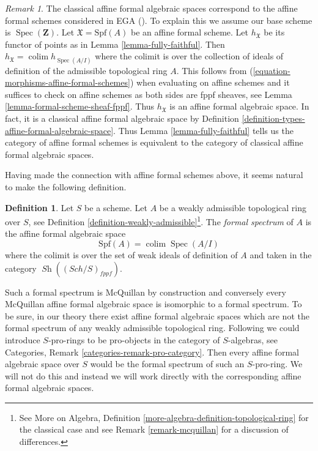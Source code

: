 \documentclass{stacks-project}
\theoremstyle{plain}
\theoremstyle{definition}
\newtheorem{definition}[subsection]{Definition}
\theoremstyle{remark}
\newtheorem{remark}[subsection]{Remark}
\numberwithin{equation}{subsection}
\def\colim{\mathop{\mathrm{colim}}\nolimits}
\def\Spec{\mathop{\mathrm{Spec}}}
\def\Sch{\mathit{Sch}}
\def\Sh{\mathop{\mathit{Sh}}\nolimits}
\begin{document}
\begin{remark}
\label{remark-compare-with-affine-formal-schemes}
The classical affine formal algebraic spaces correspond to the
affine formal schemes considered in EGA (\cite{EGA}). To explain this
we assume our base scheme is $\Spec(\mathbf{Z})$. Let
$\mathfrak X = \text{Spf}(A)$ be an affine formal scheme.
Let $h_\mathfrak X$ be its functor of points as in
Lemma \ref{lemma-fully-faithful}.
Then $h_\mathfrak X = \colim h_{\Spec(A/I)}$ where the colimit
is over the collection of ideals of definition of the admissible
topological ring $A$. This follows from
(\ref{equation-morphisms-affine-formal-schemes})
when evaluating on affine schemes and it suffices to check
on affine schemes as both sides are fppf sheaves, see
Lemma \ref{lemma-formal-scheme-sheaf-fppf}.
Thus $h_\mathfrak X$ is an affine formal algebraic space.
In fact, it is a classical affine formal algebraic space
by Definition \ref{definition-types-affine-formal-algebraic-space}.
Thus Lemma \ref{lemma-fully-faithful} tells us
the category of affine formal schemes is equivalent to the category
of classical affine formal algebraic spaces.
\end{remark}

\noindent
Having made the connection with affine formal schemes above,
it seems natural to make the following definition.

\begin{definition}
\label{definition-affine-formal-spectrum}
Let $S$ be a scheme. Let $A$ be a weakly admissible topological ring over
$S$, see Definition \ref{definition-weakly-admissible}\footnote{See
More on Algebra, Definition
\ref{more-algebra-definition-topological-ring}
for the classical case and see Remark \ref{remark-mcquillan}
for a discussion of differences.}.
The {\it formal spectrum} of $A$ is the affine formal algebraic space
$$
\text{Spf}(A) = \colim \Spec(A/I)
$$
where the colimit is over the set of weak ideals of definition of $A$
and taken in the category $\Sh((\Sch/S)_{fppf})$.
\end{definition}

\noindent
Such a formal spectrum is McQuillan by construction and conversely
every McQuillan affine formal algebraic space is isomorphic to a
formal spectrum. To be sure, in our theory there exist affine formal
algebraic spaces which are not the formal spectrum of any
weakly admissible topological ring.
Following \cite{Yasuda} we could introduce $S$-pro-rings
to be pro-objects in the category of $S$-algebras, see Categories,
Remark \ref{categories-remark-pro-category}. Then every
affine formal algebraic space over $S$ would be the formal spectrum of such
an $S$-pro-ring. We will not do this and instead we will work directly with the
corresponding affine formal algebraic spaces.
\end{document}
